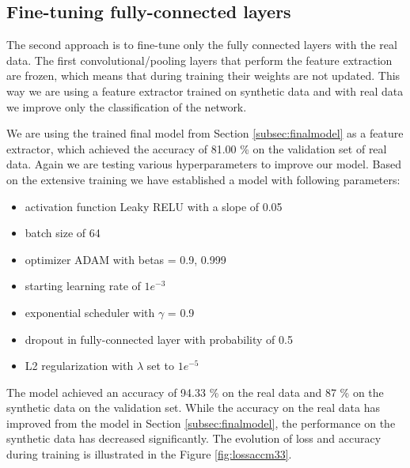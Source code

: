 \subsection{Fine-tuning fully-connected layers} \label{subsec:fcmodel}

The second approach is to fine-tune only the fully connected layers with the real data. The first convolutional/pooling layers that perform the feature extraction are frozen, which means that during training their weights are not updated. This way we are using a feature extractor trained on synthetic data and with real data we improve only the classification of the network. 

We are using the trained final model from Section \ref{subsec:finalmodel} as a feature extractor, which achieved the accuracy of 81.00 \% on the validation set of real data. Again we are testing various hyperparameters to improve our model. Based on the extensive training we have established a model with following parameters: 

\begin{itemize}
    \setlength\itemsep{1px}
    \item activation function Leaky RELU with a slope of 0.05
    \item batch size of 64
    \item optimizer ADAM with betas = 0.9, 0.999
    \item starting learning rate of $1e^{-3}$
    \item exponential scheduler with $\gamma$ = 0.9
    \item dropout in fully-connected layer with probability of 0.5
    \item L2 regularization with $\lambda$ set to $1e^{-5}$
\end{itemize}

The model achieved an accuracy of 94.33 \% on the real data and 87 \% on the synthetic data on the validation set. While the accuracy on the real data has improved from the model in Section \ref{subsec:finalmodel}, the performance on the synthetic data has decreased significantly. 
The evolution of loss and accuracy during training is illustrated in the Figure \ref{fig:lossaccm33}. 


